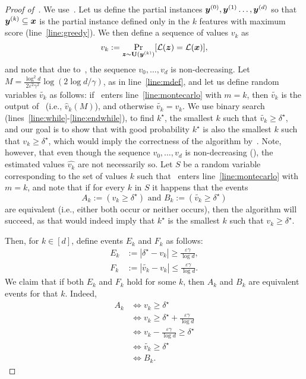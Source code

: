 	

\begin{proof}[Proof of~]
We use~. Let us define the partial instances ${\bm{y}}^{(0)}, {\bm{y}}^{(1)} \ldots, {\bm{y}}^{(d)}$ so that ${\bm{y}}^{(k)} \subseteq {\bm{x}}$ is the partial instance defined only in the $k$ features with maximum score (line~\ref{line:greedy}). %
We then define a sequence of values
  $v_k$ as
	\[
		v_k := \Pr_{{\bm{z}} \sim \mathbf{U}({\bm{y}}^{(k)})}[\mathcal{L}({\bm{z}}) = \mathcal{L}({\bm{x}})],
	\]
	and note that due to~, the sequence $v_0, \ldots, v_d$ is non-decreasing.
Let $M = \frac{\log^2{d}}{2\varepsilon^2 \gamma^2} \log(2 \log d / \gamma)$, as in line~\ref{line:mdef}, and let us define random variables $\widetilde{v_k}$ as follows: if~ enters line~\ref{line:montecarlo} with $m=k$, then $\widetilde{v_k}$ is the output of~ (i.e., $\widehat{v}_k(M)$), and otherwise $\widetilde{v_k} = v_k$.  
We use binary search (lines~\ref{line:while}-\ref{line:endwhile}), to find $k^\star$, the smallest $k$ such that
\(
	\widetilde{v_k} \geq \delta^\star,
\)
and our goal is to show that with good probability $k^\star$ is also the smallest $k$ such that $v_k \geq \delta^\star$, which would imply the correctness of the algorithm by~.
Note, however, that even though the sequence $v_0, \ldots, v_d$ is non-decreasing (), the estimated values $\widehat{v_k}$ are not necessarily so.
Let $S$ be a random variable corresponding to the set of values $k$ such that~ enters line~\ref{line:montecarlo} with $m=k$, and note that if for every $k$ in $S$ it happens that the events 
\[
	A_k := \left(v_k \geq \delta^\star \right) \text{ and }  B_k := \left(\widetilde{v_k} \geq \delta^\star\right)
\]
are equivalent (i.e., either both occur or neither occurs), then the algorithm will succeed, as that would indeed imply that $k^\star$ is the smallest $k$ such that $v_k \geq \delta^\star$. 

Then, for $k \in [d]$, define events $E_k$ and $F_k$ as follows:
\begin{align*}
	E_k &:= |\delta^\star - v_k| \geq \frac{\varepsilon \gamma}{\log d},\\
	F_k &:= |\widetilde{v_k} - v_k| \leq \frac{\varepsilon \gamma}{\log d}.
\end{align*}
We claim that if both $E_k$ and $F_k$ hold for some $k$, then $A_k$ and $B_k$ are equivalent events for that $k$. Indeed,
\begin{align*}
	A_k &\iff v_k \geq \delta^\star\\
		&\iff v_k \geq \delta^\star + \frac{\varepsilon \gamma}{\log d} \tag{by $E_k$}\\
		&\iff v_k - \frac{\varepsilon \gamma}{\log d} \geq \delta^\star\\
		&\iff \widetilde{v_k} \geq \delta^\star \tag{by $F_k$}\\
		&\iff B_k.
\end{align*}


\end{proof}
